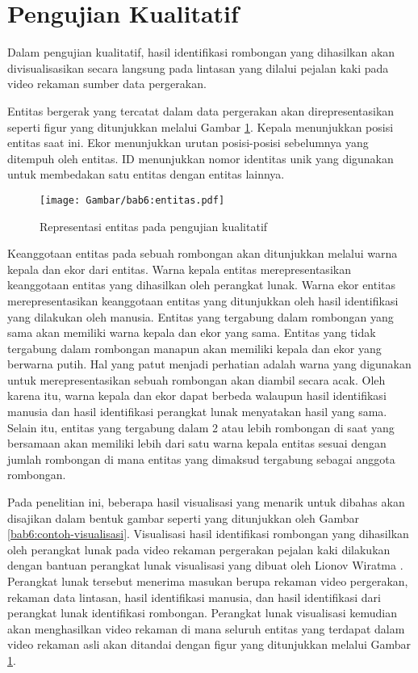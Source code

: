 \section{Pengujian Kualitatif}
\label{sec:qualitative}

Dalam pengujian kualitatif, hasil identifikasi rombongan yang dihasilkan akan divisualisasikan secara langsung pada lintasan yang dilalui pejalan kaki pada video rekaman sumber data pergerakan.

Entitas bergerak yang tercatat dalam data pergerakan akan direpresentasikan seperti figur yang ditunjukkan melalui Gambar \ref{bab6:representasi-entitas}. Kepala menunjukkan posisi entitas saat ini. Ekor menunjukkan urutan posisi-posisi sebelumnya yang ditempuh oleh entitas. ID menunjukkan nomor identitas unik yang digunakan untuk membedakan satu entitas dengan entitas lainnya.

\begin{figure}[t]
    \centering
    \texttt{[image: Gambar/bab6:entitas.pdf]}
    \caption{Representasi entitas pada pengujian kualitatif}
    \label{bab6:representasi-entitas}
\end{figure}

Keanggotaan entitas pada sebuah rombongan akan ditunjukkan melalui warna kepala dan ekor dari entitas. Warna kepala entitas merepresentasikan keanggotaan entitas yang dihasilkan oleh perangkat lunak. Warna ekor entitas merepresentasikan keanggotaan entitas yang ditunjukkan oleh hasil identifikasi yang dilakukan oleh manusia. Entitas yang tergabung dalam rombongan yang sama akan memiliki warna kepala dan ekor yang sama. Entitas yang tidak tergabung dalam rombongan manapun akan memiliki kepala dan ekor yang berwarna putih. Hal yang patut menjadi perhatian adalah warna yang digunakan untuk merepresentasikan sebuah rombongan akan diambil secara acak. Oleh karena itu, warna kepala dan ekor dapat berbeda walaupun hasil identifikasi manusia dan hasil identifikasi perangkat lunak menyatakan hasil yang sama. Selain itu, entitas yang tergabung dalam 2 atau lebih rombongan di saat yang bersamaan akan memiliki lebih dari satu warna kepala entitas sesuai dengan jumlah rombongan di mana entitas yang dimaksud tergabung sebagai anggota rombongan.

Pada penelitian ini, beberapa hasil visualisasi yang menarik untuk dibahas akan disajikan dalam bentuk gambar seperti yang ditunjukkan oleh Gambar \ref{bab6:contoh-visualisasi}. Visualisasi hasil identifikasi rombongan yang dihasilkan oleh perangkat lunak pada video rekaman pergerakan pejalan kaki dilakukan dengan bantuan perangkat lunak visualisasi yang dibuat oleh Lionov Wiratma \cite{wiratma:software}. Perangkat lunak tersebut menerima masukan berupa rekaman video pergerakan, rekaman data lintasan, hasil identifikasi manusia, dan hasil identifikasi dari perangkat lunak identifikasi rombongan. Perangkat lunak visualisasi kemudian akan menghasilkan video rekaman di mana seluruh entitas yang terdapat dalam video rekaman asli akan ditandai dengan figur yang ditunjukkan melalui Gambar \ref{bab6:representasi-entitas}. 

